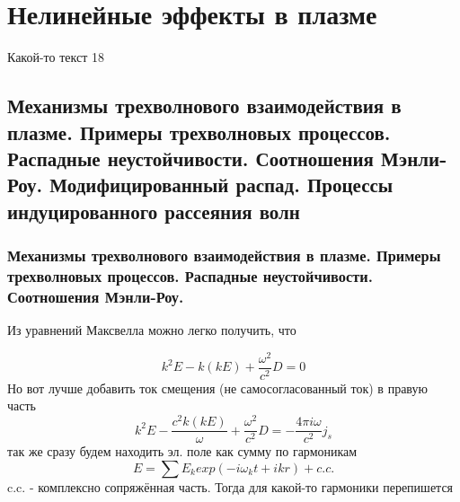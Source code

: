 \documentclass[10pt, a4paper]{article}
\let\stdsection\section
\renewcommand\section{\newpage\stdsection}
\begin{document}
\section{Нелинейные эффекты в плазме}

Какой-то текст 18

\subsection{Механизмы трехволнового взаимодействия в плазме. Примеры трехволновых процессов. Распадные неустойчивости. Соотношения Мэнли-Роу. Модифицированный распад. Процессы индуцированного рассеяния волн}
\label{subsec:3waveinterractive}

\subsubsection{Механизмы трехволнового взаимодействия в плазме. Примеры трехволновых процессов. Распадные неустойчивости. Соотношения Мэнли-Роу.}

Из уравнений Максвелла можно легко получить, что

\begin{equation}
	k^2 E - k (kE)+\frac{\omega^2}{c^2} D =0
\end{equation}
Но вот лучше добавить ток смещения (не самосогласованный ток) в правую часть
\begin{equation}
	k^2 E - \frac{c^2 k (kE)}{\omega}+\frac{\omega^2}{c^2} D =-\frac{4 \pi i \omega}{c^2} j_{s}
\end{equation}
так же сразу будем находить эл. поле как сумму по гармоникам
\begin{equation}
	E=\sum E_k exp(-i \omega_k t + ikr) + c.c.
\end{equation}
c.c. - комплексно сопряжённая часть.
Тогда для какой-то гармоники перепишется 
\end{document}
